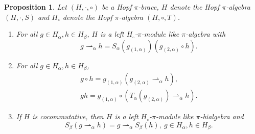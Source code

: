 \documentclass[11pt]{article}
\def\a{\alpha}
\def\b{\beta}
\newtheorem{proposition}[theorem]{Proposition}
\begin{document}
\begin{proposition}  \label{pro:pi-bialg}
Let $(H,\cdot,\circ)$ be a Hopf $\pi$-brace, $H$ denote the Hopf $\pi$-algebra $(H, \cdot, S)$ and $H_{\circ}$ denote the Hopf $\pi$-algebra $(H,\circ,T)$.
\begin{enumerate}[\quad\rm(1)]
\item For all $g\in H_\a, h\in H_\b$, $H$ is a left $H_{\circ}$-$\pi$-module like $\pi$-algebra with
    \begin{equation*} \label{eq:hbm:up}
     g\rightharpoonup_\a h=S_\a(g_{(1,\a)})(g_{(2,\a)}\circ h).
    \end{equation*}
\item For all $g\in H_\a, h\in H_\b$,
    \begin{eqnarray*}
     &g\circ h=g_{(1,\a)}(g_{(2,\a)}\rightharpoonup_\a h),& \label{eq:hbm1}\\
     &gh=g_{(1,\a)}\circ(T_\a(g_{(2,\a)})\rightharpoonup_{\bar{\a}} h).& \label{eq:hbe1}
    \end{eqnarray*}
\item If $H$ is cocommutative, then $H$ is a left $H_{\circ}$-$\pi$-module like $\pi$-bialgebra and
\begin{equation*}
  S_\b(g\rightharpoonup_\a h)=g\rightharpoonup_{\a} S_\b(h), ~g\in H_\a, h\in H_\b.
\end{equation*}
\end{enumerate}
\end{proposition}
\end{document}
